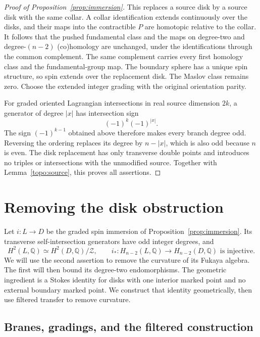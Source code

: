 \documentclass[11pt]{article}
\numberwithin{equation}{section}
\theoremstyle{definition}
\theoremstyle{remark}
\begin{document}
\begin{proof}[Proof of Proposition~\ref{prop:immersion}]
This replaces a source disk by a source disk with the same
collar.  A collar identification extends continuously over
the disks, and their maps into the contractible $P$ are
homotopic relative to the collar.  It follows that the pushed
fundamental class and the maps on degree-two and degree-$(n-2)$
(co)homology are unchanged, under the identifications through
the common complement.  The same complement carries every
first homology class and the fundamental-group map.
The boundary sphere has a unique spin structure, so spin extends
over the replacement disk.  The Maslov class remains zero.
Choose the extended integer grading with the
original orientation parity.

For graded oriented Lagrangian intersections in real source
dimension $2k$, a generator of degree $|x|$ has intersection
sign
\[
 (-1)^k(-1)^{|x|}.
\]
The sign $(-1)^{k-1}$ obtained above therefore makes every
branch degree odd.  Reversing the ordering replaces its degree
by $n-|x|$, which is also odd because $n$ is even.  The disk
replacement has only transverse double points and introduces
no triples or intersections with the unmodified source.
Together with Lemma~\ref{topo:source}, this proves all assertions.
\end{proof}

\section{Removing the disk obstruction}\label{sec:curvature}

Let $i:L\to D$ be the graded spin immersion of
Proposition~\ref{prop:immersion}.  Its transverse self-intersection
generators have odd integer degrees, and
\begin{equation}\label{curv:topological-input}
 H^2(L,\mathbb Q)\simeq H^2(D,\mathbb Q)/\mathcal Z,
 \qquad
 i_*:H_{n-2}(L,\mathbb Q)\longrightarrow H_{n-2}(D,\mathbb Q)
 \text{ is injective}.
\end{equation}
We will use the second assertion to remove the curvature of its
Fukaya algebra.  The first will then bound its degree-two endomorphisms.
The geometric ingredient is a Stokes identity for disks with one
interior marked point and no external boundary marked point.  We
construct that identity geometrically, then use filtered transfer to
remove curvature.

\subsection{Branes, gradings, and the filtered construction}
\end{document}
